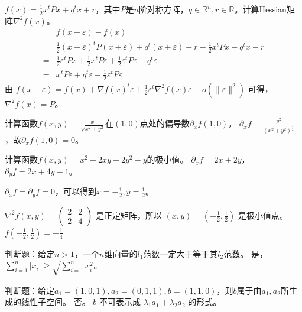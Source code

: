 \begin{problem}
	$f(x)=\frac{1}{2}x^tPx+q^tx+r$，其中$P$是$n$阶对称方阵，$q\in\mathbb{R}^{n},r\in\mathbb{R}$。计算Hessian矩阵$\nabla^2 f(x)$。
	\solution \begin{align*}
		&f(x+\varepsilon)-f(x)\\
		=&\frac{1}{2}(x+\varepsilon)^tP(x+\varepsilon)+q^t(x+\varepsilon)+r-\frac{1}{2}x^tPx-q^tx-r\\
		=&\frac{1}{2}\varepsilon^tPx+\frac{1}{2}x^tP\varepsilon+\frac{1}{2}\varepsilon^tP\varepsilon +q^t\varepsilon\\
		=&x^tP\varepsilon+q^t\varepsilon +\frac{1}{2}\varepsilon ^tP\varepsilon
	\end{align*}
	由 $f(x + \varepsilon) = f(x) + \nabla f(x)^t \varepsilon + \frac{1}{2} \varepsilon ^ t \nabla^2 f(x) \varepsilon + o(\|\varepsilon\|^2)$ 可得，$\nabla^2 f(x) = P$。
\end{problem}

\begin{problem}
	计算函数$f(x,y)=\frac{x}{\sqrt{x^2+y^2}}$在$(1,0)$点处的偏导数$\partial_xf(1,0)$。
	\solution $\partial_x f=\frac{y^2}{(x^2+y^2)^{\frac{3}{2}}}$，故$\partial_xf(1,0)=0$。
\end{problem}

\begin{problem}
	计算函数$f(x,y)=x^2+2xy+2y^2-y$的极小值。
	\solution $\partial_x f = 2x+2y$，$\partial_y f=2x+4y-1$。
	
	$\partial_x f = \partial_y f = 0$，可以得到$x=-\frac{1}{2},y=\frac{1}{2}$。

	$\nabla^2 f(x, y) = \begin{pmatrix}
		2 & 2\\
		2 & 4
	\end{pmatrix}$ 是正定矩阵，所以 $(x, y) = (-\frac{1}{2}, \frac{1}{2})$ 是极小值点。$f(-\frac{1}{2}, \frac{1}{2}) = -\frac{1}{4}$
\end{problem}

\begin{problem}
	判断题：给定$n>1$，一个$n$维向量的$l_1$范数一定大于等于其$l_2$范数。
	\solution 是，$\sum_{i=1}^n|x_i|\ge \sqrt{\sum_{i=1}^nx_i^2}$。
\end{problem}

\begin{problem}
	判断题：给定$a_1=(1,0,1),a_2=(0,1,1),b=(1,1,0)$，则$b$属于由$a_1,a_2$所生成的线性子空间。
	\solution 否。 $b$ 不可表示成 $\lambda_1 a_1 + \lambda_2 a_2$ 的形式。
\end{problem}

